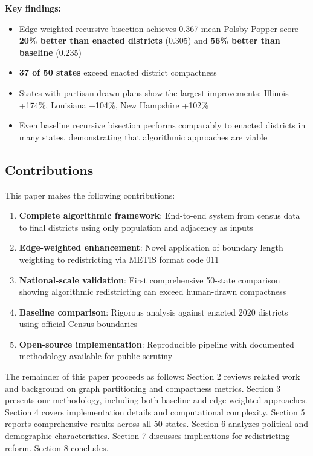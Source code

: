 \textbf{Key findings:}
\begin{itemize}
\item Edge-weighted recursive bisection achieves 0.367 mean Polsby-Popper score—\textbf{20\% better than enacted districts} (0.305) and \textbf{56\% better than baseline} (0.235)
\item \textbf{37 of 50 states} exceed enacted district compactness
\item States with partisan-drawn plans show the largest improvements: Illinois +174\%, Louisiana +104\%, New Hampshire +102\%
\item Even baseline recursive bisection performs comparably to enacted districts in many states, demonstrating that algorithmic approaches are viable
\end{itemize}

\subsection{Contributions}

This paper makes the following contributions:

\begin{enumerate}
\item \textbf{Complete algorithmic framework}: End-to-end system from census data to final districts using only population and adjacency as inputs
\item \textbf{Edge-weighted enhancement}: Novel application of boundary length weighting to redistricting via METIS format code 011
\item \textbf{National-scale validation}: First comprehensive 50-state comparison showing algorithmic redistricting can exceed human-drawn compactness
\item \textbf{Baseline comparison}: Rigorous analysis against enacted 2020 districts using official Census boundaries
\item \textbf{Open-source implementation}: Reproducible pipeline with documented methodology available for public scrutiny
\end{enumerate}

The remainder of this paper proceeds as follows: Section 2 reviews related work and background on graph partitioning and compactness metrics. Section 3 presents our methodology, including both baseline and edge-weighted approaches. Section 4 covers implementation details and computational complexity. Section 5 reports comprehensive results across all 50 states. Section 6 analyzes political and demographic characteristics. Section 7 discusses implications for redistricting reform. Section 8 concludes.
